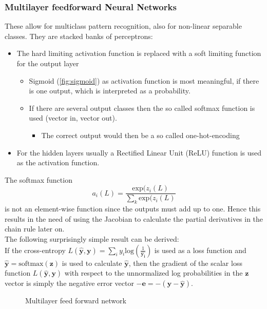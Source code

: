 \subsubsection{Multilayer feedforward Neural Networks}
These allow for multiclass pattern recognition, also for non-linear separable classes.
They are stacked banks of perceptrons:
\begin{itemize}
  \item The hard limiting activation function is replaced with a soft limiting function for the output layer
  \begin{itemize}
    \item Sigmoid (\ref{fig:sigmoid}) as activation function is most meaningful, if there is one output, which is interpreted as a probability.
    \item If there are several output classes then the so called softmax function is used (vector in, vector out).
    \begin{itemize}
      \item The correct output would then be a so called one-hot-encoding
    \end{itemize}
  \end{itemize}
  \item For the hidden layers usually a Rectified Linear Unit (ReLU) function is used as the activation function.
\end{itemize}
The softmax function
\[
  a_i(L) = \frac{\text{exp}(z_i(L)}{\sum_k \text{exp}(z_i(L)}
\]
is not an element-wise function since the outputs must add up to one.
Hence this results in the need of using the Jacobian to calculate the partial derivatives in the chain rule later on.\\
The following surprisingly simple result can be derived:\\
If the cross-entropy $L(\mathbf{\hat{y}},\mathbf{y})=\sum_i y_i \text{log}(\frac{1}{\mathbf{\hat{y_i}}})$ is used as a loss function and $\mathbf{\hat{y}} = \text{softmax}(\mathbf{z})$ is used to calculate $\mathbf{\hat{y}}$, then the gradient of the scalar loss function $L(\mathbf{\hat{y}},\mathbf{y})$ with respect to the unnormalized log probabilities in the $\mathbf{z}$ vector is simply the negative error vector $-\mathbf{e} = -(\mathbf{y}-\mathbf{\hat{y}})$.


\begin{figure}[htp]
\centering

\caption{Multilayer feed forward network}
\end{figure}

